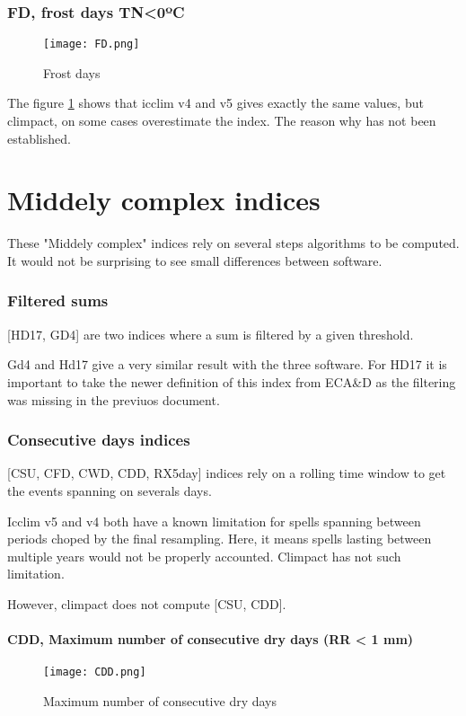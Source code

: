 \documentclass[a4paper,11pt]{article}
\begin{document}
\section{FD, frost days TN<0ºC}

    \begin{figure}[!hbt]
        \centering
        \texttt{[image: FD.png]}
        \caption{Frost days}
        \label{figure/fd}
    \end{figure}
    
    The figure \ref{figure/fd} shows that icclim v4 and v5 gives exactly the same values, but climpact, on some cases overestimate the index.
    The reason why has not been established.
    

\part{Middely complex indices}
    These "Middely complex" indices rely on several steps algorithms
    to be computed.
    It would not be surprising to see small differences between software.

\section{Filtered sums}
    [HD17, GD4] are two indices where a sum is filtered by a given threshold.

    Gd4 and Hd17 give a very similar result with the three software.
    For HD17 it is important to take the newer definition of this index from ECA\&D as the filtering was missing in the previuos document.

\section{Consecutive days indices}
    [CSU, CFD, CWD, CDD, RX5day] indices rely on a rolling time window to get the events spanning on severals days.

    Icclim v5 and v4 both have a known limitation for spells spanning between periods choped by the final resampling. Here, it means spells lasting between multiple years would not be properly accounted.
    Climpact has not such limitation.

    However, climpact does not compute [CSU, CDD].

\subsection{CDD, Maximum number of consecutive dry days (RR < 1 mm) }
    \begin{figure}[!hbt]
        \centering
        \texttt{[image: CDD.png]}
        \caption{Maximum number of consecutive dry days}
        \label{figure/cdd}
    \end{figure}
\end{document}
